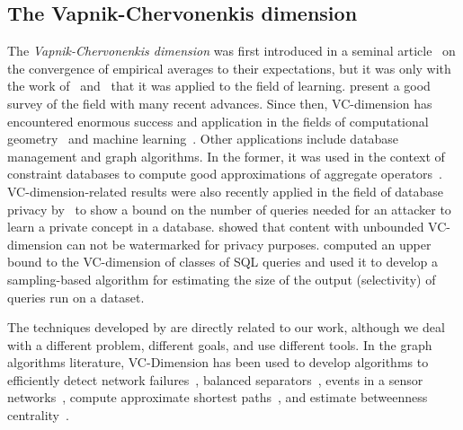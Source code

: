 \subsection{The Vapnik-Chervonenkis dimension}\label{sec:prevworkvc}
The {\em Vapnik-Chervonenkis dimension} was first introduced in a seminal
article~\citep{VapnikC71} on the convergence of empirical averages to their
expectations, but it was only with the work of~\citet{HausslerW86}
and~\citet{BlumerEHW89} that it was applied to the field of learning.
\citet{BoucheronBL05} present a good survey of the field with many recent
advances. Since then, VC-dimension has encountered enormous success and
application in the fields of computational
geometry~\citep{Chazelle00,Matousek02} and machine
learning~\citep{AnthonyB99,DevroyeGL96}. Other applications include database
management and graph algorithms.  In the former, it was used in the context of
constraint databases to compute good approximations of aggregate
operators~\citep{BenediktL02}. VC-dimension-related results were also recently
applied in the field of database privacy by~\citet{BlumLR08} to show a bound on
the number of queries needed for an attacker to learn a private concept in a
database. \citet{Gross11} showed that content with unbounded VC-dimension can
not be watermarked for privacy purposes.  \citet{RiondatoACZU11} computed an
upper bound to the VC-dimension of classes of SQL queries and used it to develop
a sampling-based algorithm for estimating the size of the output (selectivity)
of queries run on a dataset.

The techniques developed by \citet{RiondatoU14} are directly related to our work, although we deal with a 
different problem, different goals, and use different tools. In the graph
algorithms literature, VC-Dimension has been used to develop algorithms to
efficiently detect network failures~\citep{Kleinberg03,KleinbergSS08}, balanced
separators~\citep{FeigeM06}, events in a sensor networks~\citep{GandhiSW10},
compute approximate shortest paths~\citep{AbrahamDFGW11}, and estimate
betweenness centrality~\citep{RiondatoK14}.
